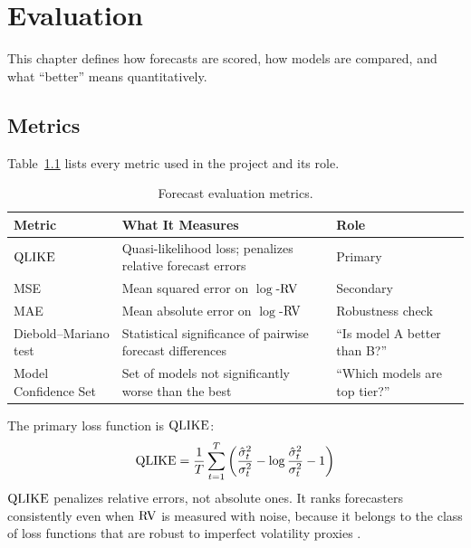 \chapter{Evaluation}
\label{ch:evaluation}

This chapter defines how forecasts are scored, how models are compared, and what ``better'' means quantitatively.

\section{Metrics}
\label{sec:eval-metrics}

Table~\ref{tab:eval-metrics} lists every metric used in the project and its role.

\begin{table}[htbp]
\centering
\caption{Forecast evaluation metrics.}
\label{tab:eval-metrics}
\small
\begin{tabular}{@{}lp{5.5cm}l@{}}
\toprule
\textbf{Metric} & \textbf{What It Measures} & \textbf{Role} \\
\midrule
$\operatorname{QLIKE}$                 & Quasi-likelihood loss; penalizes relative forecast errors  & Primary \\
MSE                      & Mean squared error on $\log$-$\operatorname{RV}$                        & Secondary \\
MAE                      & Mean absolute error on $\log$-$\operatorname{RV}$                       & Robustness check \\
Diebold--Mariano test    & Statistical significance of pairwise forecast differences  & ``Is model A better than B?'' \\
Model Confidence Set     & Set of models not significantly worse than the best        & ``Which models are top tier?'' \\
\bottomrule
\end{tabular}
\end{table}

The primary loss function is $\operatorname{QLIKE}$:
\begin{equation}
\label{eq:qlike}
\operatorname{QLIKE} = \frac{1}{T} \sum_{t=1}^{T} \left( \frac{\hat{\sigma}_t^2}{\sigma_t^2} - \log \frac{\hat{\sigma}_t^2}{\sigma_t^2} - 1 \right)
\end{equation}
$\operatorname{QLIKE}$ penalizes relative errors, not absolute ones.
It ranks forecasters consistently even when $\operatorname{RV}$ is measured with noise, because it belongs to the class of loss functions that are robust to imperfect volatility proxies \citep{Patton2011}.

